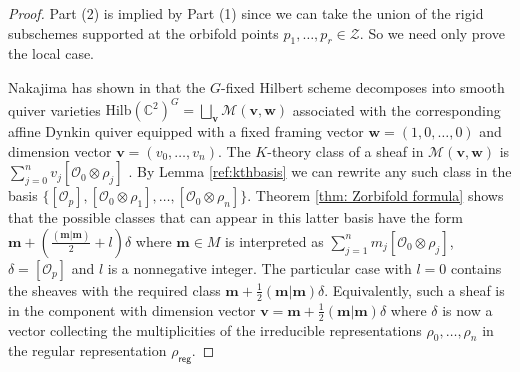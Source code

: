 \documentclass{amsart}
\theoremstyle{definition}
\newcommand{\half}{\frac{1}{2}}
\newcommand{\reg}{\mathsf{reg}}
\renewcommand{\O}{\mathcal{O}}
\newcommand{\mvec}{\bm{m}}
\newcommand{\vvec}{\bm{v }}
\newcommand{\wvec}{\bm{w }}
\begin{document}
\begin{proof}
	Part (2) is implied by Part (1) since we can take the union of the rigid subschemes supported at the orbifold points $p_1,\dots,p_r \in \mathcal{Z}$. So we need only prove the local case.
	
	Nakajima has shown in \cite[Section 2]{nakajima2002geometric} that the $G$-fixed Hilbert scheme decomposes into smooth quiver varieties
	$\mathrm{Hilb}(\mathbb{C}^2)^G = \bigsqcup_{\vvec} \mathcal{M}(\vvec,\wvec)$ associated with the corresponding affine Dynkin quiver equipped with a fixed framing vector $\wvec=(1,0,\dots,0)$ and dimension vector $\vvec=(v_0,\dots,v_{n})$.
	The $K$-theory class of a sheaf in  $\mathcal{M}(\vvec,\wvec)$ is  $\sum_{j=0}^{n}
	v_{j}[\O_{0}\otimes \rho_{j}]$  \cite[page 426]{nakajima2002geometric}. By Lemma \ref{ref:kthbasis} we can rewrite any such class in the basis $\{[\O_{p}],[\O_{0}\otimes \rho_{1}],\dots,[\O_{0}\otimes \rho_{n}]\}$. Theorem \ref{thm: Zorbifold formula} shows that the possible classes that can appear in this latter basis have the form
	$\mvec+\left( \frac{( \mvec| \mvec) }{2}+l \right)\delta $
	where $\mvec \in M$ is interpreted as $\sum_{j=1}^{n}
	m_{j}[\O_{0}\otimes \rho_{j}]$, $\delta=[\O_{p}]$ and $l$ is a nonnegative integer. The particular case with $l=0$ contains the sheaves with the required class $\mvec+\half( \mvec| \mvec)\delta $. Equivalently, such a sheaf is in the component with dimension vector $\vvec = \mvec+\half( \mvec| \mvec)\delta $ where $\delta$ is now a vector collecting the multiplicities of the irreducible representations $\rho_0,\dots,\rho_n$ in the regular representation $\rho_{\reg}$.
	
	

\end{proof}
\end{document}
